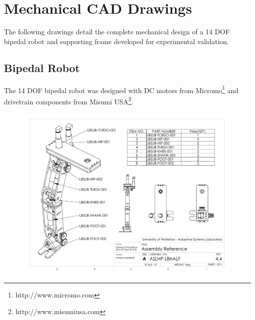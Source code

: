 \chapter[Mechanical Drawings]{Mechanical CAD Drawings}
\label{app:drawings}

The following drawings detail the complete mechanical design of a 14 DOF bipedal robot and supporting frame developed for experimental validation.  

\section{Bipedal Robot}
\label{app:bipedcad}
The 14 DOF bipedal robot was designed with DC motors from Micromo\footnote{http://www.micromo.com} and drivetrain components from Misumi USA\footnote{http://www.misumiusa.com}. 


\begin{figure}[!h]
	\begin{center}
    \includegraphics[scale=0.72,angle=90]{fig/drawings/aslhp-lbhalf.pdf}
	\end{center}
\end{figure}

